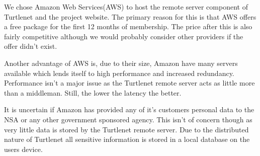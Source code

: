 We chose Amazon Web Services(AWS) to host the remote server component of Turtlenet and the project website.
The primary reason for this is that AWS offers a free package for the first 12 months of membership. The price after
this is also fairly competitive although we would probably consider other providers if the offer didn't exist.

Another advantage of AWS is, due to their size, Amazon have many servers available which lends itself to high 
performance and increased redundancy. Performance isn't a major issue as the Turtlenet remote server acts as little 
more than a middleman. Still, the lower the latency the better.

It is uncertain if Amazon has provided any of it's customers personal data to the NSA or any other government sponsored 
agency. This isn't of concern though as very little data is stored by the Turtlenet remote server. Due to the 
distributed nature of Turtlenet all sensitive information is stored in a local database on the users device.

